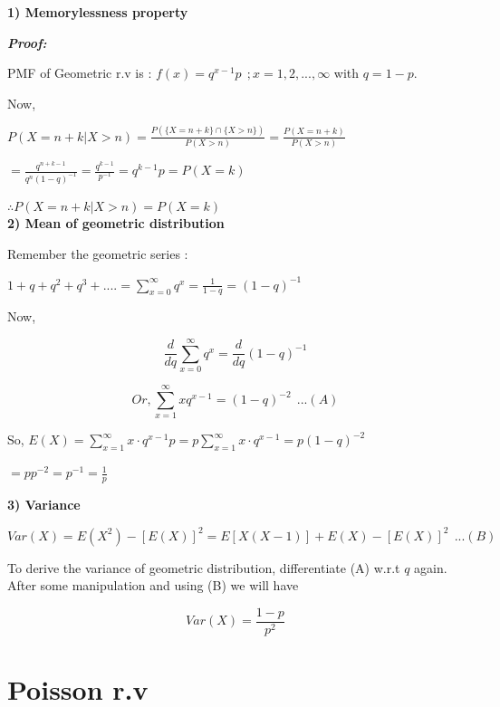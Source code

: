 \documentclass[
  11pt,
  letterpaper,
  DIV=11,
  numbers=noendperiod]{scrreprt}
\begin{document}
\begin{tcolorbox}[enhanced jigsaw, bottomrule=.15mm, toprule=.15mm, title=\textcolor{quarto-callout-note-color}{\faInfo}\hspace{0.5em}{Derivation and proofs related to Geometric distribution}, bottomtitle=1mm, colframe=quarto-callout-note-color-frame, coltitle=black, rightrule=.15mm, toptitle=1mm, colbacktitle=quarto-callout-note-color!10!white, titlerule=0mm, breakable, arc=.35mm, leftrule=.75mm, opacitybacktitle=0.6, opacityback=0, colback=white, left=2mm]

\textbf{1) Memorylessness property}

\textbf{\emph{Proof:}}

PMF of Geometric r.v is : \(f(x)=q^{x-1} p \ \ ; x=1,2,...,\infty\) with
\(q=1-p\).

Now,

\(P(X=n+k|X>n)=\frac{P(\{X=n+k\} \cap  \{X>n\} )}{P(X>n)}=\frac{P(X=n+k)}{P(X>n)}\)

\(=\frac{q^{n+k-1}}{q^n (1-q)^{-1}}=\frac{q^{k-1}}{p^{-1}}=q^{k-1}p=P(X=k)\)

\(\therefore P(X=n+k|X>n)=P(X=k)\)\\

\textbf{2) Mean of geometric distribution}

Remember the geometric series :

\(1+q+q^2+q^3+....=\sum_{x=0}^\infty q^{x}=\frac{1}{1-q}=(1-q)^{-1}\)

Now,

\[\frac{d}{dq} \sum_{x=0}^{\infty} q^{x}=\frac{d}{dq}(1-q)^{-1}\]

\[Or,\sum_{x=1}^{\infty} xq^{x-1}=(1-q)^{-2}\ \ ...(A)\]

So,
\(E(X)=\sum_{x=1}^{\infty} x\cdot q^{x-1} p=p\sum_{x=1}^{\infty} x\cdot q^{x-1}=p(1-q)^{-2}\)

\(=pp^{-2}=p^{-1}=\frac{1}{p}\)

\textbf{3) Variance}

\(Var(X)=E(X^2)-[E(X)]^2=E[X(X-1)]+E(X)-[E(X)]^2 \ \ ...(B)\)

To derive the variance of geometric distribution, differentiate (A)
w.r.t \(q\) again. After some manipulation and using (B) we will have

\[Var(X)=\frac{1-p}{p^2}\]

\end{tcolorbox}

\section{Poisson r.v}\label{poisson-r.v}
\end{document}

